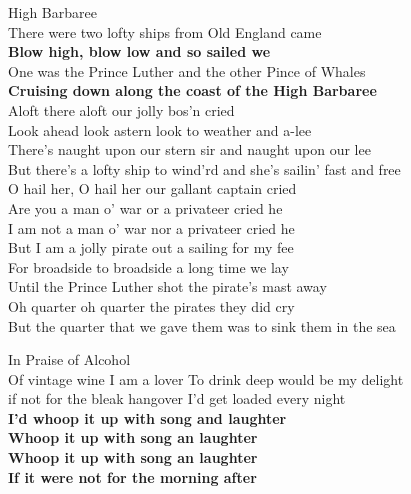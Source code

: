 \documentclass[letterpaper,9pt]{article}
\begin{document}
\newpage
{}
\Huge
High Barbaree\\

\LARGE
There were two lofty ships from Old England came \\
\textbf{Blow high, blow low and so sailed we} \\
One was the Prince Luther and the other Pince of Whales \\
\textbf{Cruising down along the coast of the High Barbaree} \\

Aloft there aloft our jolly bos’n cried \\
Look ahead look astern look to weather and a-lee \\

There’s naught upon our stern sir and naught upon our lee \\
But there’s a lofty ship to wind’rd and she’s sailin’ fast and free \\

O hail her, O hail her our gallant captain cried \\
Are you a man o’ war or a privateer cried he \\

I am not a man o’ war nor a privateer cried he \\
But I am a jolly pirate out a sailing for my fee \\

For broadside to broadside a long time we lay \\
Until the Prince Luther shot the pirate’s mast away \\

Oh quarter oh quarter the pirates they did cry \\
But the quarter that we gave them was to sink them in the sea \\

\newpage
{}
\Huge
In Praise of Alcohol\\

\Large
Of vintage wine I am a lover To drink deep would be my delight \\
if not for the bleak hangover I'd get loaded every night \\

\textbf{I'd whoop it up with song and laughter \\
Whoop it up with song an laughter \\
Whoop it up with song an laughter \\
If it were not for the morning after} \\
\end{document}
